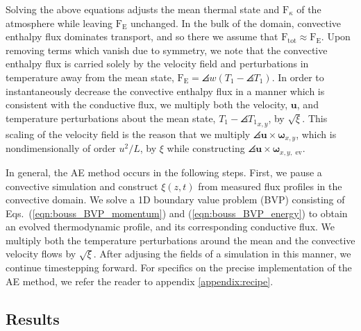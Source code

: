 Solving the above equations adjusts the mean thermal state and $\text{F}_{\kappa}$ of the atmosphere while leaving $\text{F}_{\text{E}}$ unchanged. 
In the bulk of the domain, convective enthalpy flux dominates transport, and so there we assume that $\text{F}_{\text{tot}} \approx \text{F}_{\text{E}}$. 
Upon removing terms which vanish due to symmetry, we note that the convective enthalpy flux is carried solely by the velocity field and perturbations in temperature away from the mean state, $\text{F}_{\text{E}} = \angles{w(T_1 - \angles{T_1})}$.
In order to instantaneously decrease the convective enthalpy flux in a manner which is consistent with the conductive flux, we multiply both the velocity, $\bm{u}$, and temperature perturbations about the mean state, $T_1-\angles{T_1}_{x,y}$,  by $\sqrt{\xi}$. This scaling of the velocity field is the reason that we multiply $\angles{\bm{u}\times\bm{\omega}}_{x, y}$, which is nondimensionally of order $u^2/L$, by $\xi$ while constructing $\angles{\bm{u}\times\bm{\omega}}_{x, y,\text{ ev}}$.

In general, the AE method occurs in the following steps. First, we pause a convective simulation and construct $\xi(z,t)$ from measured flux profiles in the convective domain.
We solve a 1D boundary value problem (BVP) consisting of Eqs.~(\ref{eqn:bouss_BVP_momentum}) and (\ref{eqn:bouss_BVP_energy}) to obtain an evolved thermodynamic profile, and its corresponding conductive flux.
We multiply both the temperature perturbations around the mean and the convective velocity flows by $\sqrt{\xi}$.
After adjusing the fields of a simulation in this manner, we continue timestepping forward.
For specifics on the precise implementation of the AE method, we refer the reader to appendix \ref{appendix:recipe}.

\subsection{Results}
\label{sec:abo18_results}

